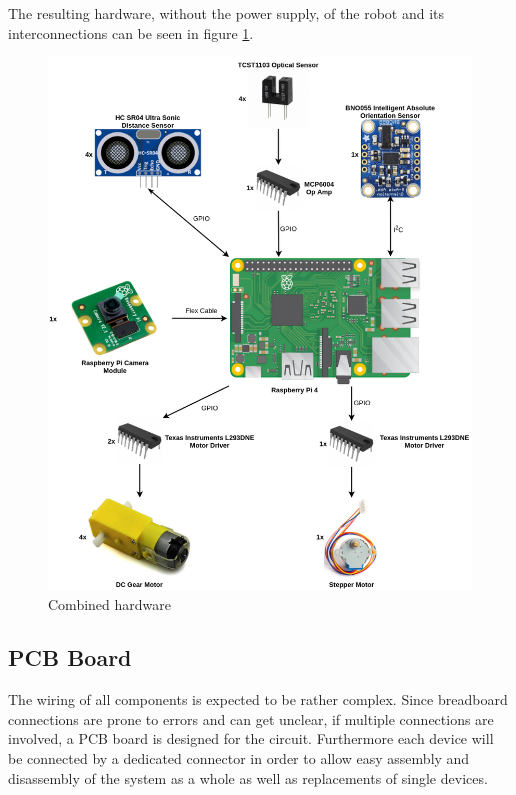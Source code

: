 The resulting hardware, without the power supply, of the robot and its interconnections can be seen in figure \ref{fig:hardware}.

\begin{figure}[H]
\centering
\includegraphics[scale=0.5]{sources/hardware_setup.png}
\caption[Combined hardware]{Combined hardware}
\label{fig:hardware}
\end{figure}

\subsection{PCB Board}\label{subsec:pcb_board}

The wiring of all components is expected to be rather complex. Since breadboard connections are prone to errors and can get unclear, if multiple connections are involved, a PCB board is designed for the circuit. Furthermore each device will be connected by a dedicated connector in order to allow easy assembly and disassembly of the system as a whole as well as replacements of single devices.


